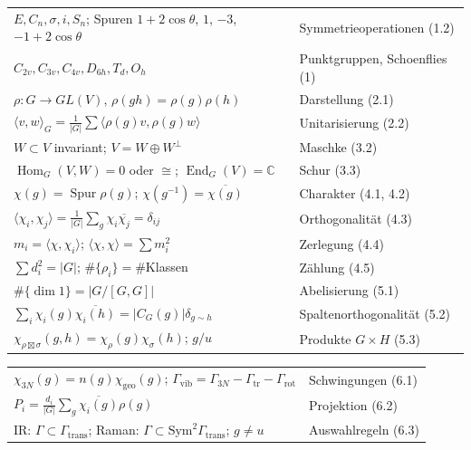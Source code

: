 \begin{merksatz}
\begin{center}
{\small
\renewcommand{\arraystretch}{1.35}
\begin{tabular}{@{}P{4.8cm}P{3.8cm}@{}}
\toprule
$E, C_n, \sigma, i, S_n$; Spuren $1 + 2\cos\theta$, $1$, $-3$, $-1 + 2\cos\theta$ & Symmetrieoperationen (1.2)\\
$C_{2v}, C_{3v}, C_{4v}, D_{6h}, T_d, O_h$ & Punktgruppen, Schoenflies (1)\\
$\rho\colon G\to GL(V)$, $\rho(gh) = \rho(g)\rho(h)$ & Darstellung (2.1)\\
$\langle v, w\rangle_G = \frac1{|G|}\sum\langle\rho(g)v, \rho(g)w\rangle$ & Unitarisierung (2.2)\\
$W\subset V$ invariant; $V = W\oplus W^{\perp}$ & Maschke (3.2)\\
$\operatorname{Hom}_G(V, W) = 0$ oder $\cong$; $\operatorname{End}_G(V) = \mathbb C$ & Schur (3.3)\\
$\chi(g) = \operatorname{Spur}\rho(g)$; $\chi(g^{-1}) = \overline{\chi(g)}$ & Charakter (4.1, 4.2)\\
$\langle\chi_i, \chi_j\rangle = \frac1{|G|}\sum_g\chi_i\overline{\chi_j} = \delta_{ij}$ & Orthogonalität (4.3)\\
$m_i = \langle\chi, \chi_i\rangle$; $\langle\chi, \chi\rangle = \sum m_i^{2}$ & Zerlegung (4.4)\\
$\sum d_i^{2} = |G|$; $\#\{\rho_i\} = \#$Klassen & Zählung (4.5)\\
$\#\{\dim 1\} = |G/[G, G]|$ & Abelisierung (5.1)\\
$\sum_i\chi_i(g)\overline{\chi_i(h)} = |C_G(g)|\delta_{g\sim h}$ & Spaltenorthogonalität (5.2)\\
$\chi_{\rho\boxtimes\sigma}(g, h) = \chi_\rho(g)\chi_\sigma(h)$; $g/u$ & Produkte $G\times H$ (5.3)\\
\bottomrule
\end{tabular}}
\end{center}
\begin{center}
{\small
\renewcommand{\arraystretch}{1.35}
\begin{tabular}{@{}P{4.8cm}P{3.8cm}@{}}
\toprule
$\chi_{3N}(g) = n(g)\chi_{\mathrm{geo}}(g)$; $\Gamma_{\mathrm{vib}} = \Gamma_{3N} - \Gamma_{\mathrm{tr}} - \Gamma_{\mathrm{rot}}$ & Schwingungen (6.1)\\
$P_i = \frac{d_i}{|G|}\sum_g\overline{\chi_i(g)}\rho(g)$ & Projektion (6.2)\\
IR: $\Gamma\subset\Gamma_{\mathrm{trans}}$; Raman: $\Gamma\subset\mathrm{Sym}^{2}\Gamma_{\mathrm{trans}}$; $g\neq u$ & Auswahlregeln (6.3)\\

\end{tabular}}
\end{center}
\end{merksatz}
